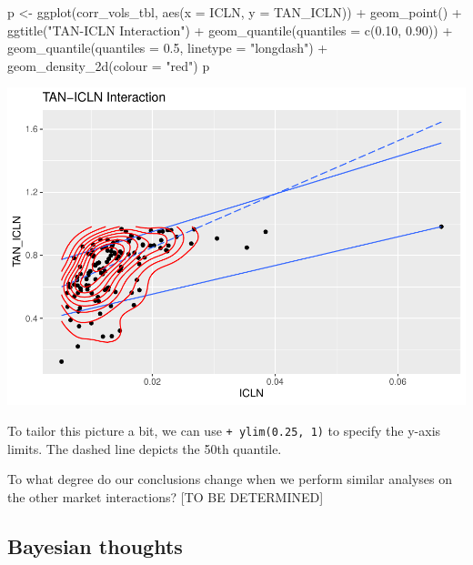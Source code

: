 \documentclass{article}
\newenvironment{Shaded}{\begin{snugshade}}{\end{snugshade}}
\newcommand{\AttributeTok}[1]{\textcolor[rgb]{0.77,0.63,0.00}{#1}}
\newcommand{\FloatTok}[1]{\textcolor[rgb]{0.00,0.00,0.81}{#1}}
\newcommand{\FunctionTok}[1]{\textcolor[rgb]{0.00,0.00,0.00}{#1}}
\newcommand{\NormalTok}[1]{#1}
\newcommand{\OtherTok}[1]{\textcolor[rgb]{0.56,0.35,0.01}{#1}}
\newcommand{\SpecialCharTok}[1]{\textcolor[rgb]{0.00,0.00,0.00}{#1}}
\newcommand{\StringTok}[1]{\textcolor[rgb]{0.31,0.60,0.02}{#1}}
\begin{document}
\begin{Shaded}
\begin{Highlighting}[]
\NormalTok{p }\OtherTok{\textless{}{-}} \FunctionTok{ggplot}\NormalTok{(corr\_vols\_tbl,  }\FunctionTok{aes}\NormalTok{(}\AttributeTok{x =}\NormalTok{ ICLN, }\AttributeTok{y =}\NormalTok{ TAN\_ICLN)) }\SpecialCharTok{+}
    \FunctionTok{geom\_point}\NormalTok{() }\SpecialCharTok{+} 
    \FunctionTok{ggtitle}\NormalTok{(}\StringTok{"TAN{-}ICLN Interaction"}\NormalTok{) }\SpecialCharTok{+} 
    \FunctionTok{geom\_quantile}\NormalTok{(}\AttributeTok{quantiles =} \FunctionTok{c}\NormalTok{(}\FloatTok{0.10}\NormalTok{, }\FloatTok{0.90}\NormalTok{)) }\SpecialCharTok{+} 
    \FunctionTok{geom\_quantile}\NormalTok{(}\AttributeTok{quantiles =} \FloatTok{0.5}\NormalTok{, }\AttributeTok{linetype =} \StringTok{"longdash"}\NormalTok{) }\SpecialCharTok{+}
    \FunctionTok{geom\_density\_2d}\NormalTok{(}\AttributeTok{colour =} \StringTok{"red"}\NormalTok{)  }
\NormalTok{p}
\end{Highlighting}
\end{Shaded}

\includegraphics{market-facts_files/figure-latex/rqplot-1.pdf}

To tailor this picture a bit, we can use \texttt{+\ ylim(0.25,\ 1)} to
specify the y-axis limits. The dashed line depicts the 50th quantile.

To what degree do our conclusions change when we perform similar
analyses on the other market interactions? {[}TO BE DETERMINED{]}

\hypertarget{bayesian-thoughts}{%
\subsection{Bayesian thoughts}\label{bayesian-thoughts}}
\end{document}
